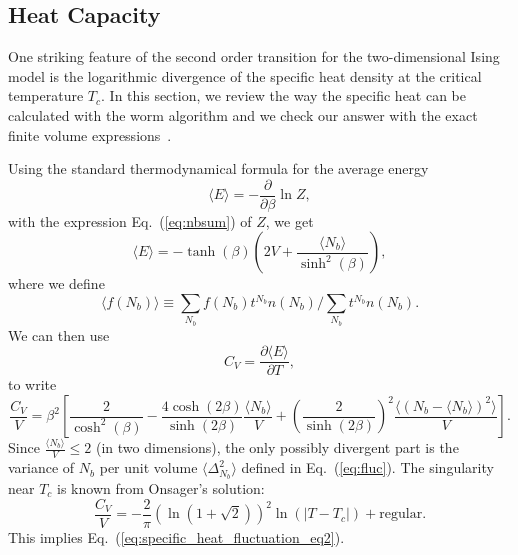 \documentclass[../main.tex]{subfiles}
\begin{document}
\subsection{Heat Capacity}%
\label{ssec:heat_capacity}
One striking feature of the second order transition for the two-dimensional
Ising model is the logarithmic divergence of the specific heat density at the
critical temperature $T_c$.
%
In this section, we review the way the specific heat can be calculated with the
worm algorithm and we check our answer with the exact finite volume
expressions~\cite{bkaufman}.

Using the standard thermodynamical formula for the average energy
%
\begin{equation}
    \langle E \rangle = - \frac{\partial}{\partial \beta} \ln Z,
\end{equation}
%
with the expression Eq.~(\ref{eq:nbsum}) of  $Z$, we get
%
\begin{equation}
    \langle E \rangle = - \tanh(\beta)\left(2V + \frac{\langle
    N_b\rangle}{\sinh^2(\beta)}\right),
\end{equation}
%
where we define
%
\begin{equation}
\langle f(N_b)\rangle \equiv \sum_{N_b} f(N_b)t^{N_b}  n(N_b)/\sum_{N_b}t^{N_b}
n(N_b).
\end{equation}
%
We can then use
%
\begin{equation}
    C_{V} = \frac{\partial \langle E \rangle}{\partial T},
\end{equation}
%
to write
%
\begin{equation}
  \frac{C_V}{V} = \beta^2 {\left[\frac{2}{\cosh^2(\beta)} 
      - \frac{4\cosh(2\beta)}{\sinh(2\beta)}
      \frac{\langle N_b\rangle}{V}
      + {\left(\frac{2}{\sinh(2\beta)}\right)}^2\frac{\langle{(N_b 
  - \langle N_b\rangle)}^2\rangle}{V} \right]}.
\end{equation}
%
Since $\frac{\langle N_b\rangle}{V}\leq 2$ (in two dimensions), the only
possibly divergent part is the variance of $N_b$ per unit volume $\langle
\Delta_{N_b}^2\rangle$ defined in Eq.~(\ref{eq:fluc}).
%
The singularity near $T_c$ is known from Onsager's solution:
%
\begin{equation}
    \frac{C_V}{V} = -\frac{2}{\pi}{\left(\ln(1+\sqrt{2})\right)}^2
    \ln{\left(|T - T_c|\right)} + \text{regular}.
    \label{eq:onsager}
\end{equation}
%
This implies Eq.~(\ref{eq:specific_heat_fluctuation_eq2}).  
%
\end{document}
